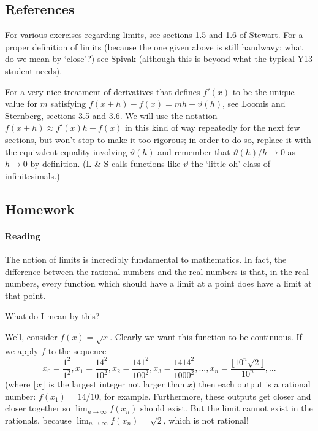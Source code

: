\subsection{References}
For various exercises regarding limits, see sections 1.5 and 1.6 of Stewart. For a proper definition of limits (because the one given
above is still handwavy: what do we mean by `close'?) see Spivak (although this is beyond what the typical Y13 student needs).

For a very nice treatment of derivatives that defines $ f'(x) $ to be the unique value for $ m $ satisfying $ f(x + h) - f(x) = mh + \vartheta(h) $,
see Loomis and Sternberg, sections 3.5 and 3.6. We will use the notation $ f(x + h) \approx f'(x) h + f(x) $ in this kind of way repeatedly
for the next few sections, but won't stop to make it too rigorous; in order to do so, replace it with the equivalent equality involving $ \vartheta(h) $
and remember that $ \vartheta(h)/h \to 0 $ as $ h \to 0 $ by definition. (L \& S calls functions like $ \vartheta $ the `little-oh' class of infinitesimals.)

\subsection{Homework}
\paragraph{Reading}
The notion of limits is incredibly fundamental to mathematics. In fact, the difference between the rational numbers and the real
numbers is that, in the real numbers, every function which should have a limit at a point does have a limit at that point.

What do I mean by this?

Well, consider $ f(x) = \sqrt{x} $. Clearly we want this function to be continuous. If we apply $ f $ to the sequence
\begin{displaymath}
  x_0 = \frac{1^2}{1^2}, x_1 = \frac{14^2}{10^2}, x_2 = \frac{141^2}{100^2}, x_3 = \frac{1414^2}{1000^2}, ..., x_n = \frac{\lfloor 10^n \sqrt{2} \rfloor}{10^n}, ...
\end{displaymath}
(where $ \lfloor x \rfloor $ is the largest integer not larger than $ x $) then each output is a rational number: $ f(x_1) = 14/10 $,
for example. Furthermore, these outputs get closer and closer together so $ \lim_{n \to \infty} f(x_n) $ should exist. But the limit
cannot exist in the rationals, because $ \lim_{n \to \infty} f(x_n) = \sqrt{2} $, which is not rational!


